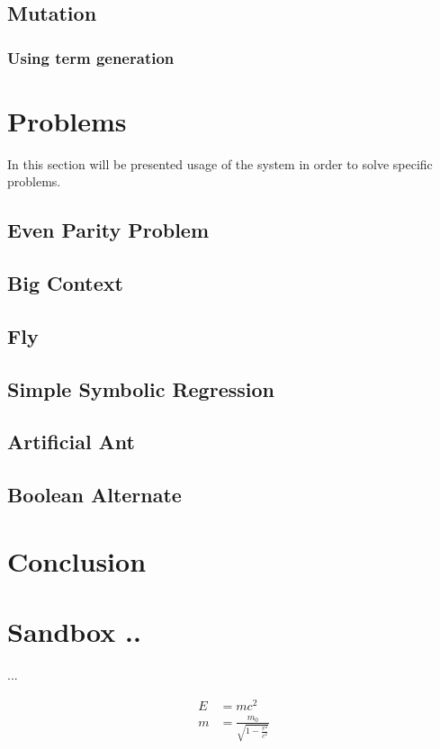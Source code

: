 \documentclass[12pt]{report}
\begin{document}
	\section{Mutation}
		\subsection{Using term generation}


\chapter{Problems}
	In this section will be presented usage of the system in order to solve specific problems.
		
	
		\section{Even Parity Problem}
		\section{Big Context}
		\section{Fly}
		\section{Simple Symbolic Regression}
		\section{Artificial Ant}
		\section{Boolean Alternate}
	

\chapter{Conclusion}
	
	
\chapter{Sandbox ..}
	
	...	
	
  	
  	\begin{align}
    	E &= mc^2                              \\
    	m &= \frac{m_0}{\sqrt{1-\frac{v^2}{c^2}}}
  	\end{align}
	
	
\end{document}
